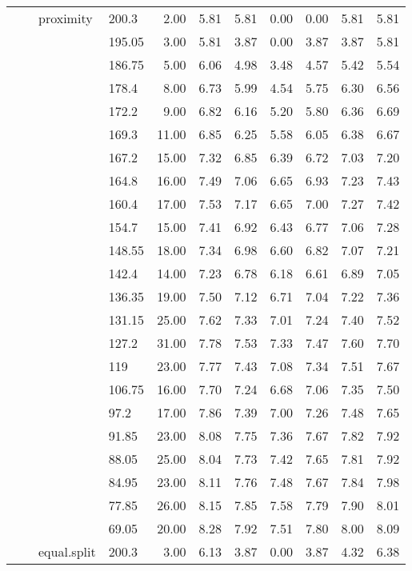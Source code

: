 \begin{longtable}{llllrrrrrrr}
   &  & proximity & 200.3 & 2.00 & 5.81 & 5.81 & 0.00 & 0.00 & 5.81 & 5.81 \\ 
   &  &  & 195.05 & 3.00 & 5.81 & 3.87 & 0.00 & 3.87 & 3.87 & 5.81 \\ 
   &  &  & 186.75 & 5.00 & 6.06 & 4.98 & 3.48 & 4.57 & 5.42 & 5.54 \\ 
   &  &  & 178.4 & 8.00 & 6.73 & 5.99 & 4.54 & 5.75 & 6.30 & 6.56 \\ 
   &  &  & 172.2 & 9.00 & 6.82 & 6.16 & 5.20 & 5.80 & 6.36 & 6.69 \\ 
   &  &  & 169.3 & 11.00 & 6.85 & 6.25 & 5.58 & 6.05 & 6.38 & 6.67 \\ 
   &  &  & 167.2 & 15.00 & 7.32 & 6.85 & 6.39 & 6.72 & 7.03 & 7.20 \\ 
   &  &  & 164.8 & 16.00 & 7.49 & 7.06 & 6.65 & 6.93 & 7.23 & 7.43 \\ 
   &  &  & 160.4 & 17.00 & 7.53 & 7.17 & 6.65 & 7.00 & 7.27 & 7.42 \\ 
   &  &  & 154.7 & 15.00 & 7.41 & 6.92 & 6.43 & 6.77 & 7.06 & 7.28 \\ 
   &  &  & 148.55 & 18.00 & 7.34 & 6.98 & 6.60 & 6.82 & 7.07 & 7.21 \\ 
   &  &  & 142.4 & 14.00 & 7.23 & 6.78 & 6.18 & 6.61 & 6.89 & 7.05 \\ 
   &  &  & 136.35 & 19.00 & 7.50 & 7.12 & 6.71 & 7.04 & 7.22 & 7.36 \\ 
   &  &  & 131.15 & 25.00 & 7.62 & 7.33 & 7.01 & 7.24 & 7.40 & 7.52 \\ 
   &  &  & 127.2 & 31.00 & 7.78 & 7.53 & 7.33 & 7.47 & 7.60 & 7.70 \\ 
   &  &  & 119 & 23.00 & 7.77 & 7.43 & 7.08 & 7.34 & 7.51 & 7.67 \\ 
   &  &  & 106.75 & 16.00 & 7.70 & 7.24 & 6.68 & 7.06 & 7.35 & 7.50 \\ 
   &  &  & 97.2 & 17.00 & 7.86 & 7.39 & 7.00 & 7.26 & 7.48 & 7.65 \\ 
   &  &  & 91.85 & 23.00 & 8.08 & 7.75 & 7.36 & 7.67 & 7.82 & 7.92 \\ 
   &  &  & 88.05 & 25.00 & 8.04 & 7.73 & 7.42 & 7.65 & 7.81 & 7.92 \\ 
   &  &  & 84.95 & 23.00 & 8.11 & 7.76 & 7.48 & 7.67 & 7.84 & 7.98 \\ 
   &  &  & 77.85 & 26.00 & 8.15 & 7.85 & 7.58 & 7.79 & 7.90 & 8.01 \\ 
   &  &  & 69.05 & 20.00 & 8.28 & 7.92 & 7.51 & 7.80 & 8.00 & 8.09 \\ 
   &  & equal.split & 200.3 & 3.00 & 6.13 & 3.87 & 0.00 & 3.87 & 4.32 & 6.38 \\ 

\end{longtable}
